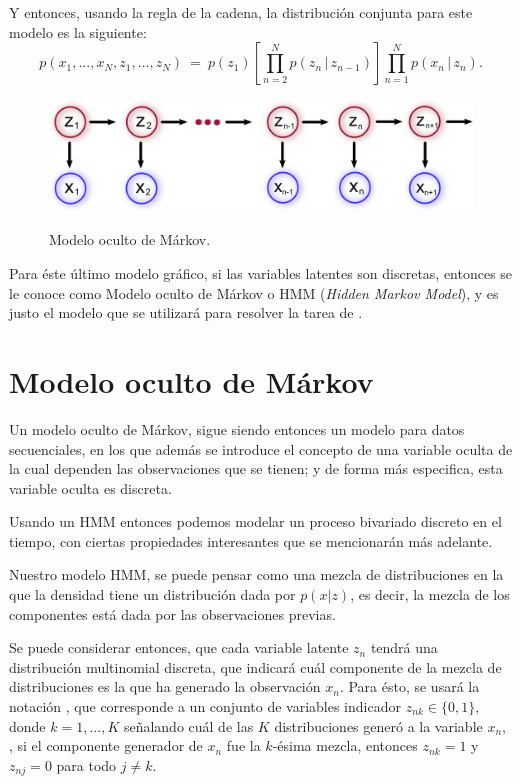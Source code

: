 Y entonces, usando la regla de la cadena, la distribución conjunta para este modelo es la siguiente: 
\begin{equation}
\label{eqn:2-7}
p(x_1, ..., x_N, z_1, ..., z_N) ~=~ 
        p(z_1) \left [ \prod_{n=2}^N p(z_n \,|\, z_{n-1}) \right ] 
\prod_{n=1}^N p(x_n \,|\, z_{n}).
\end{equation}

\begin{figure}[hbt]
        \myfloatalign
        {\includegraphics[width=0.8\linewidth]{gfx/chap2/mod-hmm1}}
        \caption{Modelo oculto de Márkov.}
        \label{fig:mod_hmm1}
\end{figure}

Para éste último modelo gráfico, si las variables latentes son discretas, entonces se le conoce como Modelo oculto de Márkov o HMM (\textit{Hidden Markov Model}), y es justo el modelo que se utilizará para resolver la tarea de \sd.

\section{Modelo oculto de Márkov}

Un modelo oculto de Márkov, sigue siendo entonces un modelo para datos secuenciales, en los que además se introduce el concepto de una variable oculta de la cual dependen las observaciones que se tienen; y de forma más especifica, esta variable oculta es discreta. 

Usando un HMM entonces podemos modelar un proceso bivariado discreto en el tiempo, con ciertas propiedades interesantes que se mencionarán más adelante.

Nuestro modelo HMM, se puede pensar como una mezcla de distribuciones en la que la densidad tiene un distribución dada por $p(x|z)$, es decir, la mezcla de los componentes está dada por las observaciones previas.

Se puede considerar entonces, que cada variable latente $z_n$ tendrá una distribución multinomial discreta, que indicará cuál componente de la mezcla de distribuciones es la que ha generado la observación $x_n$. Para ésto, se usará la notación \unk, que corresponde a un conjunto de variables indicador $z_{nk} \in \lbrace 0, 1 \rbrace$, donde $k = 1, ..., K$ señalando cuál de las $K$ distribuciones generó a la variable $x_n$, \ie, si el componente generador de $x_n$ fue la $k$-ésima mezcla, entonces $z_{nk} = 1$ y $z_{nj} = 0$ para todo $j \neq k$.

